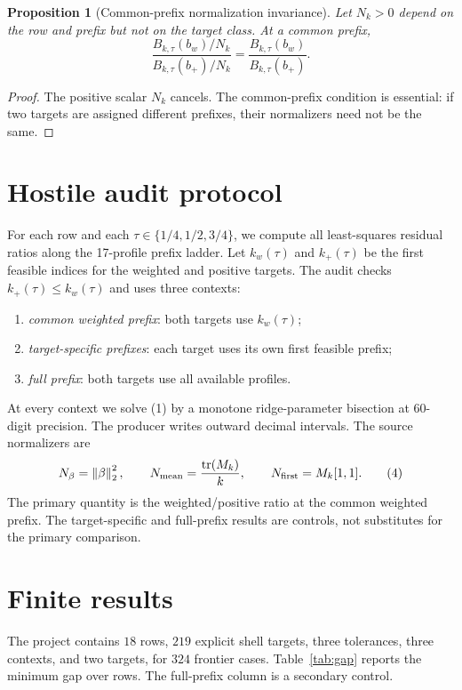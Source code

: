 \documentclass[11pt]{article}
\newtheorem{proposition}{Proposition}
\newcommand{\norm}[1]{\left\lVert #1\right\rVert}
\begin{document}
\begin{proposition}[Common-prefix normalization invariance]
Let $N_k>0$ depend on the row and prefix but not on the target class.  At a
common prefix,
\[
 \frac{B_{k,\tau}(b_w)/N_k}{B_{k,\tau}(b_+)/N_k}
 =\frac{B_{k,\tau}(b_w)}{B_{k,\tau}(b_+)}.                  \tag{3}
\]
\end{proposition}

\begin{proof}
The positive scalar $N_k$ cancels.  The common-prefix condition is essential:
if two targets are assigned different prefixes, their normalizers need not
be the same.
\end{proof}

\section{Hostile audit protocol}

For each row and each $\tau\in\{1/4,1/2,3/4\}$, we compute all least-squares
residual ratios along the 17-profile prefix ladder.  Let $k_w(\tau)$ and
$k_+(\tau)$ be the first feasible indices for the weighted and positive
targets.  The audit checks $k_+(\tau)\leq k_w(\tau)$ and uses three contexts:
\begin{enumerate}
\item \emph{common weighted prefix}: both targets use $k_w(\tau)$;
\item \emph{target-specific prefixes}: each target uses its own first
      feasible prefix;
\item \emph{full prefix}: both targets use all available profiles.
\end{enumerate}

At every context we solve (1) by a monotone ridge-parameter bisection at
60-digit precision.  The producer writes outward decimal intervals.  The
source normalizers are
\[
 N_\beta=\norm{\beta}_2^2,\qquad
 N_{\rm mean}=\frac{\operatorname{tr}(M_k)}{k},\qquad
 N_{\rm first}=M_k[1,1].                                      \tag{4}
\]
The primary quantity is the weighted/positive ratio at the common weighted
prefix.  The target-specific and full-prefix results are controls, not
substitutes for the primary comparison.

\section{Finite results}

The project contains $18$ rows, $219$ explicit shell targets, three
tolerances, three contexts, and two targets, for $324$ frontier cases.
Table~\ref{tab:gap} reports the minimum gap over rows.  The full-prefix
column is a secondary control.
\end{document}
